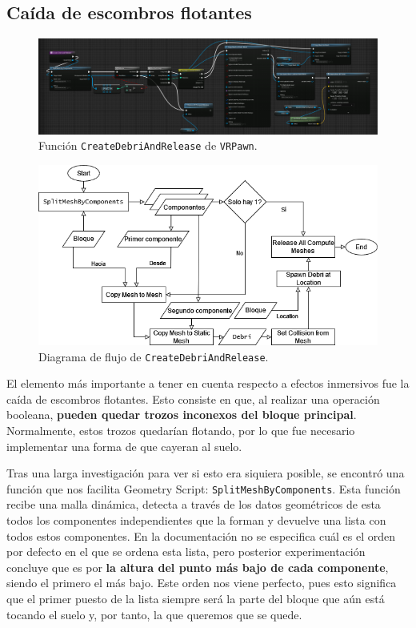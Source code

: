 \subsection{Caída de escombros flotantes}

\begin{figure}[H]
	\centering
	\includegraphics[width=12cm]{imagenes/createdebri}
	\caption{Función \texttt{CreateDebriAndRelease} de \texttt{VRPawn}.}
	\label{fig:createdebri}
\end{figure}

\begin{figure}[H]
	\centering
	\includegraphics[width=12cm]{imagenes/flowchart5}
	\caption{Diagrama de flujo de \texttt{CreateDebriAndRelease}.}
	\label{fig:fc5}
\end{figure}

El elemento más importante a tener en cuenta respecto a efectos inmersivos fue la caída de escombros flotantes. Esto consiste en que, al realizar una operación booleana, \textbf{pueden quedar trozos inconexos del bloque principal}. Normalmente, estos trozos quedarían flotando, por lo que fue necesario implementar una forma de que cayeran al suelo.

Tras una larga investigación para ver si esto era siquiera posible, se encontró una función que nos facilita Geometry Script: \texttt{SplitMeshByComponents}. Esta función recibe una malla dinámica, detecta a través de los datos geométricos de esta todos los componentes independientes que la forman y devuelve una lista con todos estos componentes. En la documentación no se especifica cuál es el orden por defecto en el que se ordena esta lista, pero posterior experimentación concluye que es por \textbf{la altura del punto más bajo de cada componente}, siendo el primero el más bajo. Este orden nos viene perfecto, pues esto significa que el primer puesto de la lista siempre será la parte del bloque que aún está tocando el suelo y, por tanto, la que queremos que se quede.

